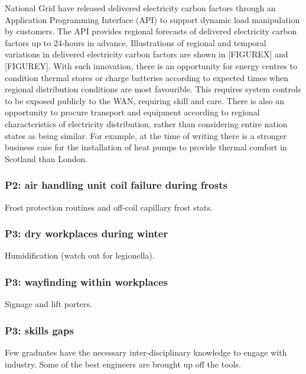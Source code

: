 \documentclass[11pt, oneside]{book}   	%
\begin{document}
National Grid have released delivered electricity carbon factors through an Application Programming Interface (API) to support dynamic load manipulation by customers.
The API provides regional forecasts of delivered electricity carbon factors up to 24-hours in advance.
Illustrations of regional and temporal variations in delivered electricity carbon factors are shown in [FIGUREX] and [FIGUREY].
With such innovation, there is an opportunity for energy centres to condition thermal stores or charge batteries according to expected times when regional distribution conditions are most favourible.
This requires system controls to be exposed publicly to the WAN, requiring skill and care.
There is also an opportunity to procure transport and equipment according to regional characteristics of electricity distribution, rather than considering entire nation states as being similar.
For example, at the time of writing there is a stronger business case for the installation of heat pumps to provide thermal comfort in Scotland than London.\

\subsubsection{P2: air handling unit coil failure during frosts}
Frost protection routines and off-coil capillary frost stats.

\subsubsection{P3: dry workplaces during winter}
Humidification (watch out for legionella).

\subsubsection{P3: wayfinding within workplaces}
Signage and lift porters.

\subsubsection{P3: skills gaps}
Few graduates have the necessary inter-disciplinary knowledge to engage with industry.
Some of the best engineers are brought up off the tools.
\end{document}
